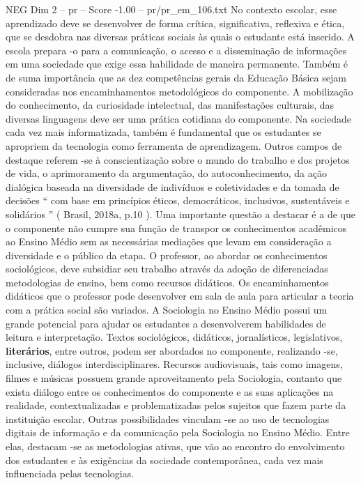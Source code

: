 \begin{textsample}{NEG Dim 2 – pr – Score -1.00 – pr/pr\_em\_106.txt}
No contexto escolar, esse aprendizado deve se desenvolver de forma crítica, significativa, reflexiva e ética, que se desdobra nas diversas práticas sociais às quais o estudante está inserido.
A escola prepara -o para a comunicação, o acesso e a disseminação de informações em uma sociedade que exige essa habilidade de maneira permanente.
Também é de suma importância que as dez competências gerais da Educação Básica sejam consideradas nos encaminhamentos metodológicos do componente.
A mobilização do conhecimento, da curiosidade intelectual, das manifestações culturais, das diversas linguagens deve ser uma prática cotidiana do componente.
Na sociedade cada vez mais informatizada, também é fundamental que os estudantes se apropriem da tecnologia como ferramenta de aprendizagem.
Outros campos de destaque referem -se à conscientização sobre o mundo do trabalho e dos projetos de vida, o aprimoramento da argumentação, do autoconhecimento, da ação dialógica baseada na diversidade de indivíduos e coletividades e da tomada de decisões “ com base em princípios éticos, democráticos, inclusivos, sustentáveis e solidários ” ( Brasil, 2018a, p.10 ).
Uma importante questão a destacar é a de que o componente não cumpre sua função de transpor os conhecimentos acadêmicos ao Ensino Médio sem as necessárias mediações que levam em consideração a diversidade e o público da etapa.
O professor, ao abordar os conhecimentos sociológicos, deve subsidiar seu trabalho através da adoção de diferenciadas metodologias de ensino, bem como recursos didáticos.
Os encaminhamentos didáticos que o professor pode desenvolver em sala de aula para articular a teoria com a prática social são variados.
A Sociologia no Ensino Médio possui um grande potencial para ajudar os estudantes a desenvolverem habilidades de leitura e interpretação.
Textos sociológicos, didáticos, jornalísticos, legislativos, \textbf{literários}, entre outros, podem ser abordados no componente, realizando -se, inclusive, diálogos interdisciplinares.
Recursos audiovisuais, tais como imagens, filmes e músicas possuem grande aproveitamento pela Sociologia, contanto que exista diálogo entre os conhecimentos do componente e as suas aplicações na realidade, contextualizadas e problematizadas pelos sujeitos que fazem parte da instituição escolar.
Outras possibilidades vinculam -se ao uso de tecnologias digitais de informação e da comunicação pela Sociologia no Ensino Médio.
Entre elas, destacam -se as metodologias ativas, que vão ao encontro do envolvimento dos estudantes e às exigências da sociedade contemporânea, cada vez mais influenciada pelas tecnologias.

\end{textsample}
